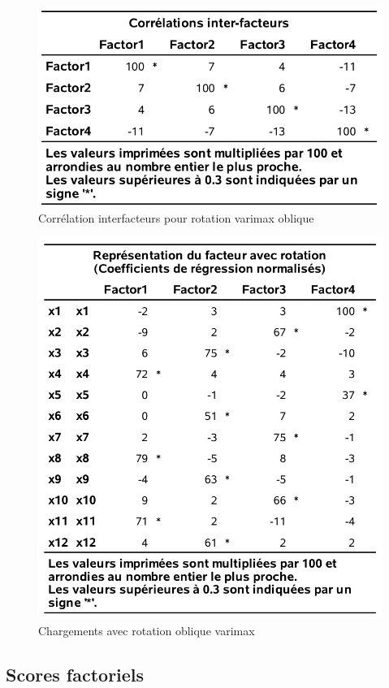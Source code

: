 \documentclass[
  11pt,
  letterpaper,
]{book}
\theoremstyle{definition}
\theoremstyle{definition}
\theoremstyle{definition}
\theoremstyle{definition}
\theoremstyle{remark}
\begin{document}
\begin{figure}

{\centering \includegraphics[width=0.7\linewidth]{figures/01-facto-e13} 

}

\caption{Corrélation interfacteurs pour rotation varimax oblique}\label{fig:fig1p13}
\end{figure}

\begin{figure}

{\centering \includegraphics[width=0.7\linewidth]{figures/01-facto-e14} 

}

\caption{Chargements avec rotation oblique varimax}\label{fig:fig1p14}
\end{figure}

\hypertarget{scores-factoriels}{%
\subsection{Scores factoriels}\label{scores-factoriels}}
\end{document}
